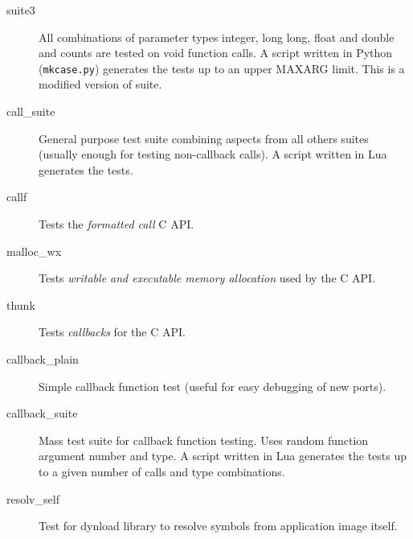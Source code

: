 \begin{description}
\item [suite3]
All combinations of parameter types integer, long long, float and double and
counts are tested on void function calls.
A script written in Python ({\tt mkcase.py}) generates the tests up to
an upper MAXARG limit.
This is a modified version of suite.

\item [call\_suite]
General purpose test suite combining aspects from all others suites (usually enough for
testing non-callback calls).
A script written in Lua generates the tests.

\item [callf]
Tests the \emph{formatted call}  C API.

\item [malloc\_wx]
Tests \emph{writable and executable memory allocation} used by the
 C API.

\item [thunk]
Tests \emph{callbacks} for the  C API.

\item [callback\_plain]
Simple callback function test (useful for easy debugging of new ports).

\item [callback\_suite]
Mass test suite for callback function testing. Uses random function argument
number and type.
A script written in Lua generates the tests up to a given number of calls and
type combinations.

\item [resolv\_self]
Test for dynload library to resolve symbols from application image itself.

\end{description}


